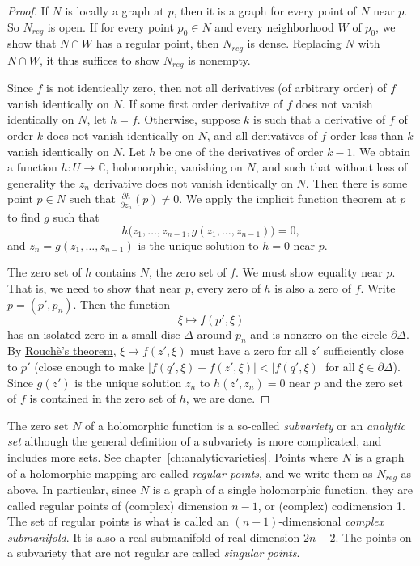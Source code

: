 \documentclass[12pt,openany]{book}
\newcommand{\sabs}[1]{\lvert {#1} \rvert}
\newcommand{\C}{{\mathbb{C}}}
\newcommand{\myindex}[1]{#1\index{#1}}
\theoremstyle{plain}
\theoremstyle{remark}
\theoremstyle{definition}
\theoremstyle{exercise}
\theoremstyle{example}
\newcommand{\chapterref}[1]{\hyperref[#1]{chapter~\ref*{#1}}}
\begin{document}
\begin{proof}
If $N$ is locally a graph at $p$, then it is a graph
for every point of $N$ near $p$.  So $N_{\mathit{reg}}$
is open.
If for every point $p_0 \in N$
and every neighborhood $W$ of $p_0$, we show that
$N \cap W$ has a regular point, then $N_{\mathit{reg}}$ is dense.
Replacing $N$ with $N \cap W$, it thus suffices to show
$N_{\mathit{reg}}$ is nonempty.

Since $f$ is not identically zero, then not all derivatives (of arbitrary
order) of $f$
vanish identically on $N$.
If some first order derivative of $f$ does not vanish identically on $N$,
let $h=f$.
Otherwise, suppose $k$ is such that a derivative of $f$ of order $k$
does not vanish identically on $N$, and
all derivatives of $f$ order less than $k$ vanish identically on
$N$.  Let $h$ be one of the derivatives of order $k-1$.
We obtain a function $h \colon U \to \C$, holomorphic, vanishing on $N$,
and such that 
without loss of generality the $z_n$ derivative does not vanish identically
on $N$.  Then there is some point $p \in N$ such that $\frac{\partial
h}{\partial z_n}(p) \not= 0$.
We apply the implicit function theorem at $p$ to find $g$ such that
\begin{equation*}
h\bigr(z_1,\ldots,z_{n-1},g(z_1,\ldots,z_{n-1})\bigr) = 0 ,
\end{equation*}
and $z_n = g(z_1,\ldots,z_{n-1})$ is the unique solution to
$h=0$ near $p$.

The zero set of $h$ contains $N$, the zero set of $f$.
We must show equality near $p$.  That is, we need to show that
near $p$, every zero of $h$ is also a zero of $f$.
Write $p = (p',p_n)$.  Then the function
\begin{equation*}
\xi \mapsto f(p',\xi)
\end{equation*}
has an isolated zero in a small disc $\Delta$ around $p_n$ and is
nonzero on the circle $\partial \Delta$.  By
\hyperref[thm:onevarrouche]{Rouch\`e's theorem},
$\xi \mapsto f(z',\xi)$ must have a zero for all $z'$ sufficiently close to $p'$
(close enough to make $\sabs{f(q',\xi)-f(z',\xi)} < \sabs{f(q',\xi)}$ for all $\xi \in
\partial \Delta$).
Since $g(z')$ is the unique solution $z_n$ to $h(z',z_n) = 0$
near $p$ and the
zero set of $f$ is contained in the zero set of $h$, we are done.
\end{proof}

The zero set $N$ of a holomorphic function is a so-called
\emph{\myindex{subvariety}}
or an \emph{\myindex{analytic set}}
although the general definition of a
subvariety is more complicated, and includes more sets.
See \chapterref{ch:analyticvarieties}.
Points where $N$ is a graph of a holomorphic mapping are called
\emph{regular points}, and we write them as
$N_{\mathit{reg}}$ as above.  In particular,
since $N$ is a graph of a single holomorphic function, they are called
regular points of (complex) dimension $n-1$, or (complex) codimension 1.
The set of regular points is what is called an
$(n-1)$-dimensional \emph{\myindex{complex submanifold}}.  It is also a real
submanifold of real dimension $2n-2$.
The points on a subvariety that are not regular are called
\emph{singular points}.
\end{document}
